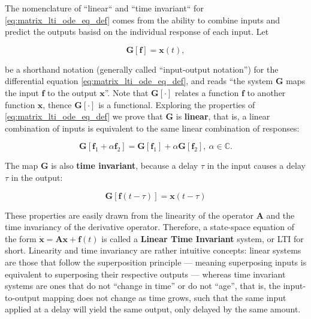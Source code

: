 	The nomenclature of ``linear`` and ``time invariant`` for \eqref{eq:matrix_lti_ode_eq_def} comes from the ability to combine inputs and predict the outputs basisd on the individual response of each input. Let 

\begin{equation} \mathbf{G}\left[\mathbf{f}\right] = \mathbf{x}(t) , \label{eq:lti_system_def} \end{equation}

	\noindent be a shorthand notation (generally called ``input-output notation'') for the differential equation \eqref{eq:matrix_lti_ode_eq_def}, and reads ``the system $\mathbf{G}$ maps the input $\mathbf{f}$ to the output $\mathbf{x}$''. Note that $\mathbf{G}\left[\cdot\right]$ relates a function $\mathbf{f}$ to another function $\mathbf{x}$, thence $\mathbf{G}\left[\cdot\right]$ is a functional. Exploring the properties of \eqref{eq:matrix_lti_ode_eq_def} we prove that $\mathbf{G}$ is \textbf{linear}, that is, a linear combination of inputs is equivalent to the same linear combination of responses:
	
\begin{equation} \mathbf{G}\left[\mathbf{f}_1 + \alpha\mathbf{f}_2\right] = \mathbf{G}\left[\mathbf{f}_1\right] + \alpha\mathbf{G}\left[\mathbf{f}_2\right],\ \alpha\in\mathbb{C} \label{eq:lti_scaling}.\end{equation}

	The map $\mathbf{G}$ is also \textbf{time invariant}, because a delay $\tau$ in the input causes a delay $\tau$ in the output:

\begin{equation} \mathbf{G}\left[\mathbf{f}\left(t - \tau\right)\right] = \mathbf{x}\left(t-\tau\right) \label{eq:lti_delay}\end{equation}

	These properties are easily drawn from the linearity of the operator $\mathbf{A}$ and the time invariancy of the derivative operator. Therefore, a state-space equation of the form $\dot{\mathbf{x}} = \mathbf{Ax} + \mathbf{f}\left(t\right)$ is called a \textbf{Linear Time Invariant} system, or LTI for short. Linearity and time invariancy are rather intuitive concepts: linear systems are those that follow the superposition principle — meaning superposing inputs is equivalent to superposing their respective outputs — whereas time invariant systems are ones that do not ``change in time'' or do not ``age'', that is, the input-to-output mapping does not change as time grows, such that the same input applied at a delay will yield the same output, only delayed by the same amount.

